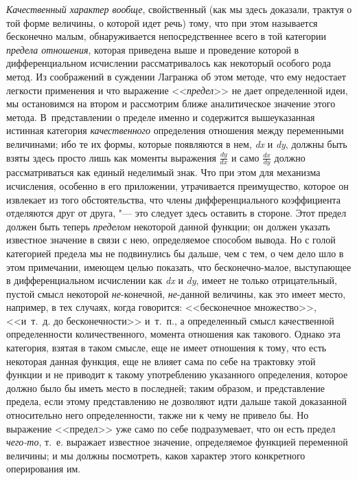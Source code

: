 {\em Качественный характер вообще}, свойственный (как мы
здесь доказали, трактуя о той форме величины, о которой идет речь) тому,
что при этом называется бесконечно малым, обнаруживается непосредственнее
всего в той категории {\em предела отношения}, которая
приведена выше и проведение которой в дифференциальном исчислении
рассматривалось как некоторый особого рода метод. Из соображений в суждении
Лагранжа об этом методе, что ему недостает легкости применения и что
выражение <<{\em предел}>> не дает определенной идеи, мы
остановимся на втором и рассмотрим ближе аналитическое значение этого
метода. В~представлении о пределе именно и содержится вышеуказанная
истинная категория {\em качественного} определения
отношения между переменными величинами; ибо те их формы, которые появляются
в нем, {\em dx} и {\em dy}, должны
быть взяты здесь просто лишь как моменты выражения 
$\frac{dy}{dx}$ и само 
$\frac{dx}{dy}$ должно рассматриваться как единый
неделимый знак. Что при этом для механизма исчисления, особенно в его
приложении, утрачивается преимущество, которое он извлекает из того
обстоятельства, что члены дифференциального коэффициента отделяются друг от
друга, "--- это следует здесь оставить в стороне. Этот предел должен быть
теперь {\em пределом} некоторой данной функции; он
должен указать известное значение в связи с нею, определяемое способом
вывода. Но с голой категорией предела мы не подвинулись бы дальше, чем с
тем, о чем дело шло в этом примечании, имеющем целью показать, что
бесконечно-малое, выступающее в дифференциальном исчислении как
{\em dx} и {\em dy}, имеет не только отрицательный, пустой смысл некоторой
{\em не}-конечной, {\em не}-данной величины, как это имеет место,
например, в тех случаях, когда говорится: <<бесконечное множество>>, <<и~т.~д.
до бесконечности>> и~т.~п., а определенный смысл качественной определенности
количественного, момента отношения как такового. Однако эта категория,
взятая в таком смысле, еще не имеет отношения к тому, что есть некоторая
данная функция, еще не влияет сама по себе на трактовку этой функции и не
приводит к такому употреблению указанного определения, которое должно было
бы иметь место в последней; таким образом, и представление предела, если
этому представлению не дозволяют идти дальше такой доказанной относительно
него определенности, также ни к чему не привело бы. Но выражение <<предел>>
уже само по себе подразумевает, что он есть предел
{\em чего-то}, т.~е. выражает известное значение,
определяемое функцией переменной величины; и мы должны посмотреть, каков
характер этого конкретного оперирования им.

